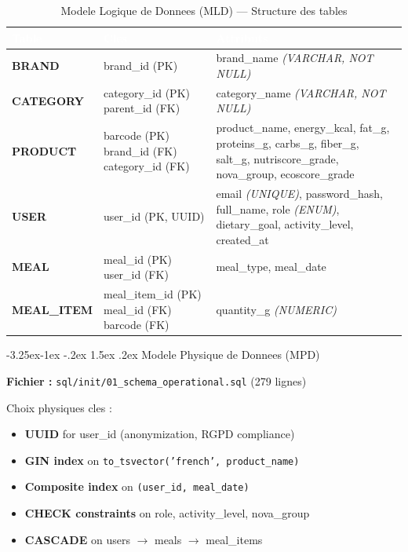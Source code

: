 \documentclass[a4paper,11pt,oneside,openany]{report}
\makeatletter
\renewcommand\subsection{\@startsection{subsection}{2}{\z@}%
  {-3.25ex\@plus -1ex \@minus -.2ex}%
  {1.5ex \@plus .2ex}%
  {\normalfont\large\bfseries\color{ntdarkgreen}}}
\newcommand{\rgpd}{RGPD}
\makeatother
\begin{document}
\begin{table}[H]
\centering
\caption{Modele Logique de Donnees (MLD) --- Structure des tables}
\label{tab:mld}
\begin{tabularx}{\textwidth}{>{\ttfamily\bfseries}l L{3cm} X}
\toprule
{}
\textcolor{white}{\textbf{Table}} & \textcolor{white}{\textbf{Cles}} & \textcolor{white}{\textbf{Attributs}} \\
\midrule
BRAND & brand\_id (PK) & brand\_name \textit{(VARCHAR, NOT NULL)} \\
CATEGORY & category\_id (PK) \newline parent\_id (FK) & category\_name \textit{(VARCHAR, NOT NULL)} \\
PRODUCT & barcode (PK) \newline brand\_id (FK) \newline category\_id (FK) & product\_name, energy\_kcal, fat\_g, proteins\_g, carbs\_g, fiber\_g, salt\_g, nutriscore\_grade, nova\_group, ecoscore\_grade \\
USER & user\_id (PK, UUID) & email \textit{(UNIQUE)}, password\_hash, full\_name, role \textit{(ENUM)}, dietary\_goal, activity\_level, created\_at \\
MEAL & meal\_id (PK) \newline user\_id (FK) & meal\_type, meal\_date \\
MEAL\_ITEM & meal\_item\_id (PK) \newline meal\_id (FK) \newline barcode (FK) & quantity\_g \textit{(NUMERIC)} \\
\bottomrule
\end{tabularx}
\end{table}

\subsection{Modele Physique de Donnees (MPD)}

\textbf{Fichier :} \texttt{sql/init/01\_schema\_operational.sql} (279 lignes)

Choix physiques cles :
\begin{itemize}[nosep]
  \item \textbf{UUID} for user\_id (anonymization, \rgpd{} compliance)
  \item \textbf{GIN index} on \texttt{to\_tsvector('french', product\_name)}
  \item \textbf{Composite index} on \texttt{(user\_id, meal\_date)}
  \item \textbf{CHECK constraints} on role, activity\_level, nova\_group
  \item \textbf{CASCADE} on users $\rightarrow$ meals $\rightarrow$ meal\_items
\end{itemize}
\end{document}
